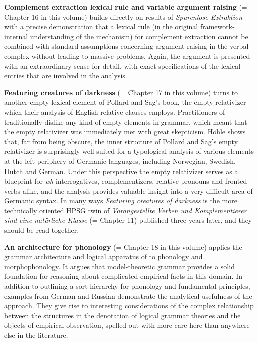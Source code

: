 \begin{refsection}
\textbf{Complement extraction lexical rule and variable
  argument raising} (= Chapter 16 in this volume) builds directly on results of \emph{Spurenlose
  Extraktion} with a precise demonstration that a lexical
rule (in the original framework-internal understanding of the mechanism) for complement
extraction cannot be combined with standard  assumptions concerning
argument raising in the verbal complex without leading to massive
problems. Again, the argument is presented with an extraordinary sense
for detail, with exact specifications of the lexical entries that are
involved in the analysis.


\addlines[2]
\textbf{Featuring creatures of darkness} (= Chapter 17 in this volume) turns to another empty lexical
element of Pollard and Sag's book, the empty relativizer which their
analysis of English relative clauses employs. Practitioners of
 traditionally
dislike any kind of empty elements in grammar, which meant that the
empty relativizer was immediately met with great skepticism.
Höhle shows that, far from being obscure, the inner structure of
Pollard and Sag's empty relativizer is surprisingly well-suited for a
typological analysis of various elements at the left periphery of
Germanic languages, including Norwegian, Swedish, Dutch and German. Under this perspective the empty relativizer
serves as a blueprint for \emph{wh}-interrogatives, complementizers, relative
pronouns and fronted verbs alike, and the analysis provides valuable insight into a
very difficult area of Germanic syntax. In many ways \emph{Featuring
  creatures of darkness} is the more technically oriented HPSG twin of
\emph{Vorangestellte Verben und Komplementierer sind eine natürliche
Klasse} (= Chapter 11) published three years later, and they should be read together.

\textbf{An architecture for phonology} (= Chapter 18 in this volume) applies the grammar
architecture and logical apparatus of  to
phonology and morphophonology. It argues that model-theoretic grammar
provides a solid foundation for reasoning about complicated empirical
facts in this domain. In addition to outlining a sort hierarchy for
phonology and fundamental principles, examples from German and Russian
demonstrate the analytical usefulness of the approach. They give rise
to interesting considerations of the complex relationship between
the structures in the denotation of logical grammar theories and the
objects of empirical observation, spelled out with more care here than
anywhere else in the literature.



\end{refsection}

